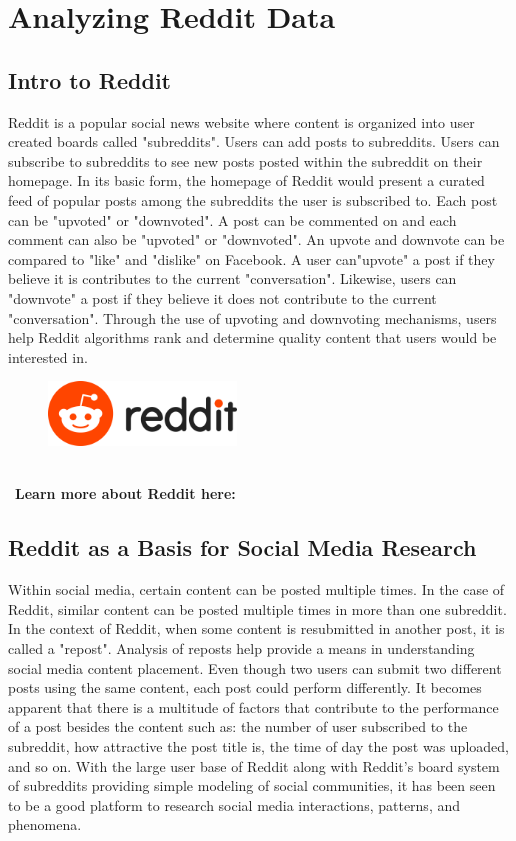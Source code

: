 \documentclass{article}
\begin{document}
\section{Analyzing Reddit Data}
\subsection*{Intro to Reddit}
Reddit is a popular social news website where content is organized into user created boards called "subreddits". Users can add posts to subreddits.  Users can subscribe to subreddits to see new posts posted within the subreddit on their homepage. In its basic form, the homepage of Reddit would present a curated feed of popular posts among the subreddits the user is subscribed to. Each post can be "upvoted" or "downvoted". A post can be commented on and each comment can also be "upvoted" or "downvoted". An upvote and downvote can be compared to "like" and "dislike" on Facebook. A user can"upvote" a post if they believe it is contributes to the current "conversation". Likewise, users can "downvote" a post if they believe it does not contribute to the current "conversation". Through the use of upvoting and downvoting mechanisms, users help Reddit algorithms rank and determine quality content that users would be interested in.

\begin{figure}[hbt!]
\vspace{-0.0cm}
\centering
\includegraphics[width=5cm]{images/reddit-logo}
\vspace{-0.2cm}
\end{figure}

\-\\\ \noindent \textbf{Learn more about Reddit here:} \href{https://en.wikipedia.org/wiki/Reddit}{\color{blue}{https://en.wikipedia.org/wiki/Reddit}}


\subsection*{Reddit as a Basis for Social Media Research}
Within social media, certain content can be posted multiple times. In the case of Reddit, similar content can be posted multiple times in more than one subreddit. In the context of Reddit, when some content is resubmitted in another post, it is called a "repost". Analysis of reposts help provide a means in understanding social media content placement. Even though two users can submit two different posts using the same content, each post could perform differently. It becomes apparent that there is a multitude of factors that contribute to the performance of a post besides the content such as: the number of user subscribed to the subreddit, how attractive the post title is, the time of day the post was uploaded, and so on. With the large user base of Reddit along with Reddit's board system of subreddits providing simple modeling of social communities, it has been seen to be a good platform to research social media interactions, patterns, and phenomena.
\end{document}
